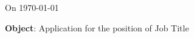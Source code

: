 \documentclass[10pt, a4paper]{article}
\begin{document}
    \initdocument
    
    
    
    
    On \today
    
    \textbf{Object}: Application for the position of Job Title
    
    
    
\end{document}
